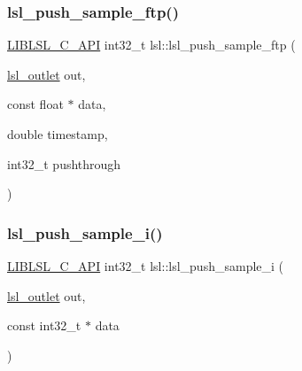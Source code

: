 \mbox{\label{namespacelsl_a6434485fd96e3260939bfe6fea2b317e}} 
\subsubsection{\texorpdfstring{lsl\+\_\+push\+\_\+sample\+\_\+ftp()}{lsl\_push\_sample\_ftp()}}
{\footnotesize\ttfamily \hyperlink{lsl__cpp_8h_aafd0ef1813e8be84a1420c4f1df64615}{L\+I\+B\+L\+S\+L\+\_\+\+C\+\_\+\+A\+PI} int32\+\_\+t lsl\+::lsl\+\_\+push\+\_\+sample\+\_\+ftp (\begin{DoxyParamCaption}\item[{\hyperlink{namespacelsl_abcf512b0f66dacf86c10b165995fd50b}{lsl\+\_\+outlet}}]{out,  }\item[{const float $\ast$}]{data,  }\item[{double}]{timestamp,  }\item[{int32\+\_\+t}]{pushthrough }\end{DoxyParamCaption})}

\mbox{\label{namespacelsl_a5e6e682a09b4c90732e4fc631d643384}} 
\subsubsection{\texorpdfstring{lsl\+\_\+push\+\_\+sample\+\_\+i()}{lsl\_push\_sample\_i()}}
{\footnotesize\ttfamily \hyperlink{lsl__cpp_8h_aafd0ef1813e8be84a1420c4f1df64615}{L\+I\+B\+L\+S\+L\+\_\+\+C\+\_\+\+A\+PI} int32\+\_\+t lsl\+::lsl\+\_\+push\+\_\+sample\+\_\+i (\begin{DoxyParamCaption}\item[{\hyperlink{namespacelsl_abcf512b0f66dacf86c10b165995fd50b}{lsl\+\_\+outlet}}]{out,  }\item[{const int32\+\_\+t $\ast$}]{data }\end{DoxyParamCaption})}

\mbox{\label{namespacelsl_a87f61ecb0058ef8cd14a84693770b51d}} 
